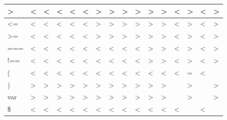 \documentclass[11pt,a4paper]{article}
\begin{document}
\begin{table}[h!]
\begin{tabular}{|l|l|l|l|l|l|l|l|l|l|l|l|l|l|l|l|}
        \textgreater{}  & \textless{}    & \textless{}    & \textless{}    & \textless{}    & \textless{}    & \textgreater{} & \textgreater{} & \textgreater{} & \textgreater{}  & \textgreater{} & \textgreater{} & \textless{} & \textgreater{} & \textless{} & \textgreater{} \\ \hline
        \textless{}=    & \textless{}    & \textless{}    & \textless{}    & \textless{}    & \textless{}    & \textgreater{} & \textgreater{} & \textgreater{} & \textgreater{}  & \textgreater{} & \textgreater{} & \textless{} & \textgreater{} & \textless{} & \textgreater{} \\ \hline
        \textgreater{}= & \textless{}    & \textless{}    & \textless{}    & \textless{}    & \textless{}    & \textgreater{} & \textgreater{} & \textgreater{} & \textgreater{}  & \textgreater{} & \textgreater{} & \textless{} & \textgreater{} & \textless{} & \textgreater{} \\ \hline
        ===             & \textless{}    & \textless{}    & \textless{}    & \textless{}    & \textless{}    & \textless{}    & \textless{}    & \textless{}    & \textless{}     & \textgreater{} & \textgreater{} & \textless{} & \textgreater{} & \textless{} & \textgreater{} \\ \hline
        !==             & \textless{}    & \textless{}    & \textless{}    & \textless{}    & \textless{}    & \textless{}    & \textless{}    & \textless{}    & \textless{}     & \textgreater{} & \textgreater{} & \textless{} & \textgreater{} & \textless{} & \textgreater{} \\ \hline
        (               & \textless{}    & \textless{}    & \textless{}    & \textless{}    & \textless{}    & \textless{}    & \textless{}    & \textless{}    & \textless{}     & \textless{}    & \textless{}    & \textless{} & =              & \textless{} &                \\ \hline
        )               & \textgreater{} & \textgreater{} & \textgreater{} & \textgreater{} & \textgreater{} & \textgreater{} & \textgreater{} & \textgreater{} & \textgreater{}  & \textgreater{} & \textgreater{} &             & \textgreater{} &             & \textgreater{} \\ \hline
        var             & \textgreater{} & \textgreater{} & \textgreater{} & \textgreater{} & \textgreater{} & \textgreater{} & \textgreater{} & \textgreater{} & \textgreater{}  & \textgreater{} & \textgreater{} &             & \textgreater{} &             & \textgreater{} \\ \hline
        \$              & \textless{}    & \textless{}    & \textless{}    & \textless{}    & \textless{}    & \textless{}    & \textless{}    & \textless{}    & \textless{}     & \textless{}    & \textless{}    & \textless{} &                & \textless{} &                \\ \hline
        \end{tabular}
        \end{table}
        
\end{document}

